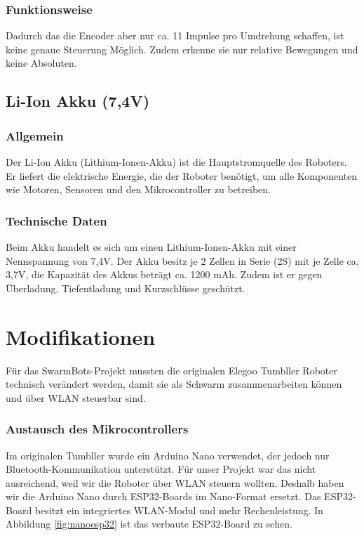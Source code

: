\subsubsection{Funktionsweise}
Dadurch das die Encoder aber nur ca. 11 Impulse pro Umdrehung schaffen, ist keine genaue Steuerung Möglich. 
Zudem erkenne sie nur relative Bewegungen und keine Absoluten.
%
\subsection{Li-Ion Akku (7,4V)}
%
\subsubsection{Allgemein}
Der Li-Ion Akku (Lithium-Ionen-Akku) ist die Hauptstromquelle des Roboters. 
Er liefert die elektrische Energie, die der Roboter benötigt, um alle Komponenten wie Motoren, Sensoren und den Mikrocontroller zu betreiben.
\subsubsection{Technische Daten}
Beim Akku handelt es sich um einen Lithium-Ionen-Akku mit einer Nennspannung von 7,4V. 
Der Akku besitz je 2 Zellen in Serie (2S) mit je Zelle ca. 3,7V, die Kapazität des Akkus beträgt ca. 1200 mAh. Zudem ist er gegen Überladung, Tiefentladung und Kurzschlüsse geschützt. 
%

\section{Modifikationen}
\label{subsec:hardware_modifikationen}

Für das SwarmBots-Projekt mussten die originalen Elegoo Tumbller Roboter technisch verändert werden, damit sie als Schwarm zusammenarbeiten können und über WLAN steuerbar sind.

\subsubsection{Austausch des Mikrocontrollers}
Im originalen Tumbller wurde ein Arduino Nano verwendet, der jedoch nur Bluetooth-Kommunikation unterstützt. Für unser Projekt war das nicht ausreichend, weil wir die Roboter über WLAN steuern wollten. Deshalb haben wir die Arduino Nano durch ESP32-Boards im Nano-Format ersetzt. Das ESP32-Board besitzt ein integriertes WLAN-Modul und mehr Rechenleistung. In Abbildung \ref{fig:nanoesp32} ist das verbaute ESP32-Board zu sehen.

